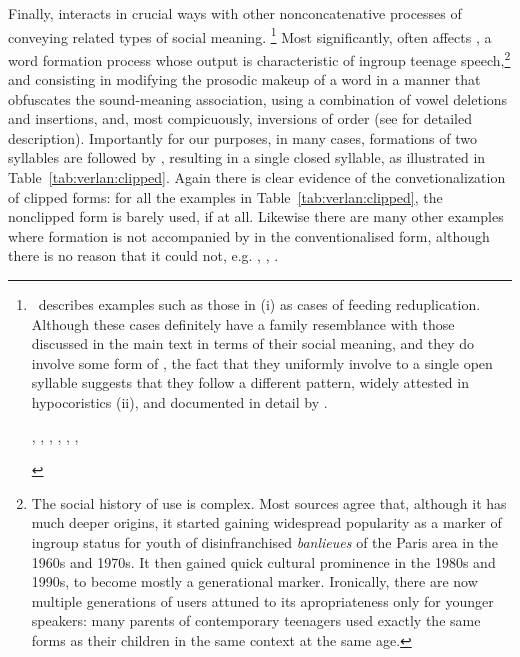 \documentclass[output=paper,colorlinks,citecolor=brown]{langscibook}
\begin{document}

Finally,  interacts in crucial ways with other nonconcatenative processes of  conveying related types of social meaning.%
\footnote{\citet{antoine2000} describes examples such as those in (i) as cases of  feeding reduplication. Although these cases definitely have a family resemblance with those discussed in the main text in terms of their social meaning, and they do involve some form of , the fact that they uniformly involve  to a single open syllable suggests that they follow a different pattern, widely attested in hypocoristics (ii), and documented in detail by \citet{plenat1984}.
	\begin{exe}
		 , , , , 
		 , , 
	\end{exe}
}
Most significantly,  often affects \emph{}, a word formation process whose output is characteristic of ingroup teenage speech,\footnote{The social history of  use is complex. Most sources agree that, although it has much deeper origins, it started gaining widespread popularity as a marker of ingroup status for youth of disinfranchised \emph{banlieues} of the Paris area in the 1960s and 1970s. It then gained quick cultural prominence in the 1980s and 1990s, to become mostly a generational marker. Ironically, there are now multiple generations of \emph{} users attuned to its apropriateness only for younger speakers: many parents of contemporary teenagers used exactly the same forms as their children in the same context at the same age.} and consisting in modifying the prosodic makeup of a word in a manner that obfuscates the sound-meaning association, using a combination of vowel deletions and insertions, and, most compicuously, inversions of order (see \citealt{lefkowitz1991,plenat1995} for detailed description). Importantly for our purposes, in many cases,  formations of two syllables are followed by , resulting in a single closed syllable,  as illustrated in Table~\ref{tab:verlan:clipped}. Again there is clear evidence of the convetionalization of clipped forms: for all the examples in Table~\ref{tab:verlan:clipped}, the nonclipped form is barely used, if at all. Likewise there are many other examples where  formation is not accompanied by  in the conventionalised form, although there is no reason that it could not, e.g. , , .
\end{document}
